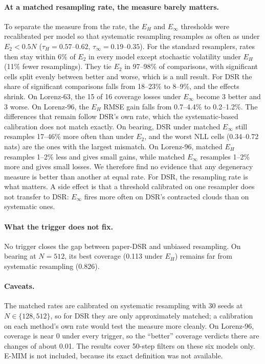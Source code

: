 \paragraph{At a matched resampling rate, the measure barely matters.} To separate the measure from the rate, the $E_H$ and $E_\infty$ thresholds were recalibrated per model so that systematic resampling resamples as often as under $E_2<0.5N$ ($\tau_H=0.57$--$0.62$, $\tau_\infty=0.19$--$0.35$). For the standard resamplers, rates then stay within 6\% of $E_2$ in every model except stochastic volatility under $E_H$ (11\% fewer resamplings). They tie $E_2$ in 97--98\% of comparisons, with significant cells split evenly between better and worse, which is a null result. For DSR the share of significant comparisons falls from 18--23\% to 8--9\%, and the effects shrink. On Lorenz-63, the 15 of 16 coverage losses under $E_\infty$ become 3 better and 3 worse. On Lorenz-96, the $E_H$ RMSE gain falls from 0.7--4.4\% to 0.2--1.2\%. The differences that remain follow DSR's own rate, which the systematic-based calibration does not match exactly. On bearing, DSR under matched $E_\infty$ still resamples 17--46\% more often than under $E_2$, and the worst NLL cells (0.34--0.72 nats) are the ones with the largest mismatch. On Lorenz-96, matched $E_H$ resamples 1--2\% less and gives small gains, while matched $E_\infty$ resamples 1--2\% more and gives small losses. We therefore find no evidence that any degeneracy measure is better than another at equal rate. For DSR, the resampling rate is what matters. A side effect is that a threshold calibrated on one resampler does not transfer to DSR: $E_\infty$ fires more often on DSR's contracted clouds than on systematic ones.

\paragraph{What the trigger does not fix.} No trigger closes the gap between paper-DSR and unbiased resampling. On bearing at $N{=}512$, its best coverage (0.113 under $E_H$) remains far from systematic resampling (0.826).

\paragraph{Caveats.} The matched rates are calibrated on systematic resampling with 30 seeds at $N\in\{128,512\}$, so for DSR they are only approximately matched; a calibration on each method's own rate would test the measure more cleanly. On Lorenz-96, coverage is near 0 under every trigger, so the ``better'' coverage verdicts there are changes of about 0.01. The results cover 50-step filters on these six models only. E-MIM is not included, because its exact definition was not available.
